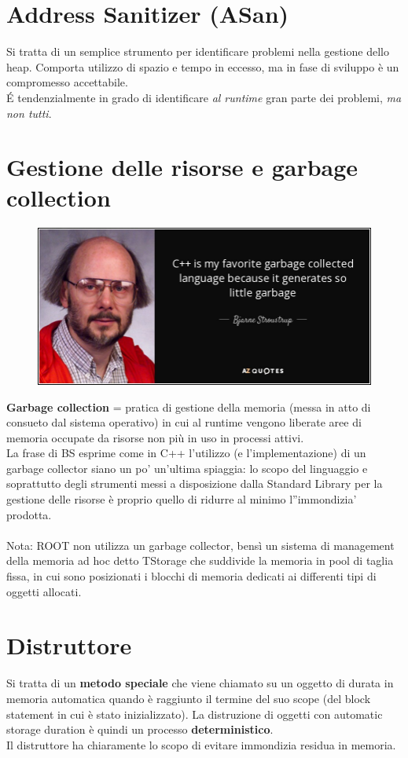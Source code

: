 \documentclass[10pt, oneside]{book}
\begin{document}
\section{Address Sanitizer (ASan)}
Si tratta di un semplice strumento per identificare problemi nella gestione dello heap. Comporta utilizzo di spazio e tempo in eccesso, ma in fase di sviluppo è un compromesso accettabile.\\
\'E tendenzialmente in grado di identificare \textit{al runtime} gran parte dei problemi, \textit{ma non tutti}.

\section{Gestione delle risorse e garbage collection}
\begin{figure}[h!]
\centering
\includegraphics[scale=0.5]{bjarne.jpg}
\end{figure}
\textbf{Garbage collection} = pratica di gestione della memoria (messa in atto di consueto dal sistema operativo) in cui al runtime vengono liberate aree di memoria occupate da risorse non più in uso in processi attivi.\\
La frase di BS esprime come in C++ l'utilizzo (e l'implementazione) di un garbage collector siano un po' un'ultima spiaggia: lo scopo del linguaggio e soprattutto degli strumenti messi a disposizione dalla Standard Library per la gestione delle risorse è proprio quello di ridurre al minimo l''immondizia' prodotta.\\~\\
Nota: ROOT non utilizza un garbage collector, bensì un sistema di management della memoria ad hoc detto TStorage che suddivide la memoria in pool di taglia fissa, in cui sono posizionati i blocchi di memoria dedicati ai differenti tipi di oggetti allocati.

\section{Distruttore}
Si tratta di un \textbf{metodo speciale} che viene chiamato su un oggetto di durata in memoria automatica quando è raggiunto il termine del suo scope (del block statement in cui è stato inizializzato). La distruzione di oggetti con automatic storage duration è quindi un processo \textbf{deterministico}.\\
Il distruttore ha chiaramente lo scopo di evitare immondizia residua in memoria.
\end{document}
